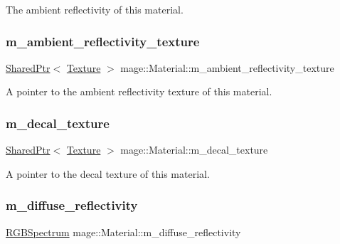 The ambient reflectivity of this material. \hypertarget{structmage_1_1_material_a72a90b9d339d705b5fd46098df5892e2}{}\label{structmage_1_1_material_a72a90b9d339d705b5fd46098df5892e2} 
\subsubsection{\texorpdfstring{m\+\_\+ambient\+\_\+reflectivity\+\_\+texture}{m\_ambient\_reflectivity\_texture}}
{\footnotesize\ttfamily \hyperlink{namespacemage_a1e01ae66713838a7a67d30e44c67703e}{Shared\+Ptr}$<$ \hyperlink{classmage_1_1_texture}{Texture} $>$ mage\+::\+Material\+::m\+\_\+ambient\+\_\+reflectivity\+\_\+texture\hspace{0.3cm}{\ttfamily [private]}}

A pointer to the ambient reflectivity texture of this material. \hypertarget{structmage_1_1_material_acdab45e5d78ddbb7f717d9db67ff3fcf}{}\label{structmage_1_1_material_acdab45e5d78ddbb7f717d9db67ff3fcf} 
\subsubsection{\texorpdfstring{m\+\_\+decal\+\_\+texture}{m\_decal\_texture}}
{\footnotesize\ttfamily \hyperlink{namespacemage_a1e01ae66713838a7a67d30e44c67703e}{Shared\+Ptr}$<$ \hyperlink{classmage_1_1_texture}{Texture} $>$ mage\+::\+Material\+::m\+\_\+decal\+\_\+texture\hspace{0.3cm}{\ttfamily [private]}}

A pointer to the decal texture of this material. \hypertarget{structmage_1_1_material_afd2cc813023698e52edc01b267a17e6c}{}\label{structmage_1_1_material_afd2cc813023698e52edc01b267a17e6c} 
\subsubsection{\texorpdfstring{m\+\_\+diffuse\+\_\+reflectivity}{m\_diffuse\_reflectivity}}
{\footnotesize\ttfamily \hyperlink{structmage_1_1_r_g_b_spectrum}{R\+G\+B\+Spectrum} mage\+::\+Material\+::m\+\_\+diffuse\+\_\+reflectivity\hspace{0.3cm}{\ttfamily [private]}}

